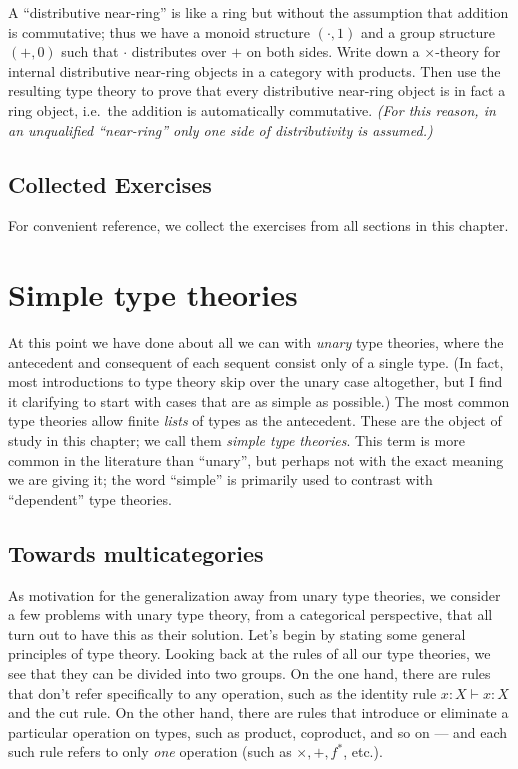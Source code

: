 \documentclass{book}
\let\types\vdash
\def\exaccum{}
\def\ChapterExercises{\section*{Collected Exercises}
  For convenient reference, we collect the exercises from all sections in this chapter.
  \bgroup\def\label##1{}\exaccum\egroup%
  \def\exaccum{}}
\begin{document}
\begin{ex}\label{ex:catprod-nearring}
  A ``distributive near-ring'' is like a ring but without the assumption that addition is commutative; thus we have a monoid structure $(\cdot,1)$ and a group structure $(+,0)$ such that $\cdot$ distributes over $+$ on both sides.
  Write down a $\times$-theory for internal distributive near-ring objects in a category with products.
  Then use the resulting type theory to prove that every distributive near-ring object is in fact a ring object, i.e.\ the addition is automatically commutative.
  \textit{(For this reason, in an unqualified ``near-ring'' only one side of distributivity is assumed.)}
\end{ex}


\ChapterExercises


\chapter{Simple type theories}
\label{chap:simple}

At this point we have done about all we can with \emph{unary} type theories, where the antecedent and consequent of each sequent consist only of a single type.
(In fact, most introductions to type theory skip over the unary case altogether, but I find it clarifying to start with cases that are as simple as possible.)
The most common type theories allow finite \emph{lists} of types as the antecedent.
These are the object of study in this chapter; we call them \emph{simple type theories}.
This term is more common in the literature than ``unary'', but perhaps not with the exact meaning we are giving it; the word ``simple'' is primarily used to contrast with ``dependent'' type theories.


\section{Towards multicategories}
\label{sec:why-multicats}

As motivation for the generalization away from unary type theories, we consider a few problems with unary type theory, from a categorical perspective, that all turn out to have this as their solution.
Let's begin by stating some general principles of type theory.
Looking back at the rules of all our type theories, we see that they can be divided into two groups.
On the one hand, there are rules that don't refer specifically to any operation, such as the identity rule $x:X \types x:X$ and the cut rule.
On the other hand, there are rules that introduce or eliminate a particular operation on types, such as product, coproduct, and so on --- and each such rule refers to only \emph{one} operation  (such as $\times,+,f^*$, etc.).
\end{document}

